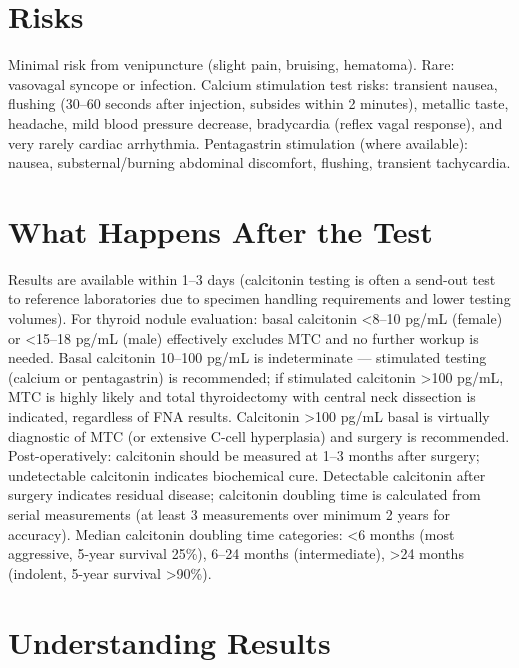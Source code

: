 \section*{Risks}
Minimal risk from venipuncture (slight pain, bruising, hematoma). Rare: vasovagal syncope or infection. Calcium stimulation test risks: transient nausea, flushing (30--60 seconds after injection, subsides within 2 minutes), metallic taste, headache, mild blood pressure decrease, bradycardia (reflex vagal response), and very rarely cardiac arrhythmia. Pentagastrin stimulation (where available): nausea, substernal/burning abdominal discomfort, flushing, transient tachycardia.

\section*{What Happens After the Test}
Results are available within 1--3 days (calcitonin testing is often a send-out test to reference laboratories due to specimen handling requirements and lower testing volumes). For thyroid nodule evaluation: basal calcitonin <8--10 pg/mL (female) or <15--18 pg/mL (male) effectively excludes MTC and no further workup is needed. Basal calcitonin 10--100 pg/mL is indeterminate --- stimulated testing (calcium or pentagastrin) is recommended; if stimulated calcitonin >100 pg/mL, MTC is highly likely and total thyroidectomy with central neck dissection is indicated, regardless of FNA results. Calcitonin >100 pg/mL basal is virtually diagnostic of MTC (or extensive C-cell hyperplasia) and surgery is recommended. Post-operatively: calcitonin should be measured at 1--3 months after surgery; undetectable calcitonin indicates biochemical cure. Detectable calcitonin after surgery indicates residual disease; calcitonin doubling time is calculated from serial measurements (at least 3 measurements over minimum 2 years for accuracy). Median calcitonin doubling time categories: <6 months (most aggressive, 5-year survival 25\%), 6--24 months (intermediate), >24 months (indolent, 5-year survival >90\%).

\section*{Understanding Results}

